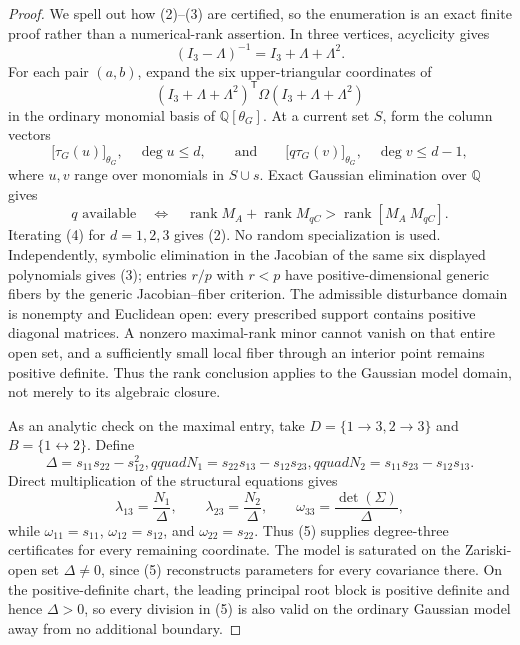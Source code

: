 \documentclass{article}
\begin{document}
\begin{proof}
We spell out how (2)--(3) are certified, so the enumeration is an exact finite proof rather than a numerical-rank assertion.  In three vertices, acyclicity gives
\[
 (I_3-\Lambda)^{-1}=I_3+\Lambda+\Lambda^2.
\]
For each pair \((a,b)\), expand the six upper-triangular coordinates of
\[
 (I_3+\Lambda+\Lambda^2)^{\mathsf T}\Omega(I_3+\Lambda+\Lambda^2)
\]
in the ordinary monomial basis of \(\mathbb Q[\theta_G]\).  At a current set \(S\), form the column vectors
\[
 \bigl[\tau_G(u)\bigr]_{\theta_G},\quad \deg u\leq d,
 \qquad\text{and}\qquad
 \bigl[q\tau_G(v)\bigr]_{\theta_G},\quad \deg v\leq d-1,
\]
where \(u,v\) range over monomials in \(S\cup s\).  Exact Gaussian elimination over \(\mathbb Q\) gives
\[
 q\text{ available}\quad\Longleftrightarrow\quad
 \operatorname{rank}M_A+\operatorname{rank}M_{qC}>
 \operatorname{rank}[M_A\ M_{qC}]. \tag{4}
\]
Iterating (4) for \(d=1,2,3\) gives (2).  No random specialization is used.  Independently, symbolic elimination in the Jacobian of the same six displayed polynomials gives (3); entries \(r/p\) with \(r<p\) have positive-dimensional generic fibers by the generic Jacobian--fiber criterion.
The admissible disturbance domain is nonempty and Euclidean open: every prescribed support contains positive diagonal matrices.  A nonzero maximal-rank minor cannot vanish on that entire open set, and a sufficiently small local fiber through an interior point remains positive definite.  Thus the rank conclusion applies to the Gaussian model domain, not merely to its algebraic closure.

As an analytic check on the maximal entry, take \(D=\{1\to3,2\to3\}\) and \(B=\{1\leftrightarrow2\}\).  Define
\[
 \Delta=s_{11}s_{22}-s_{12}^2,qquad
 N_1=s_{22}s_{13}-s_{12}s_{23},qquad
 N_2=s_{11}s_{23}-s_{12}s_{13}.
\]
Direct multiplication of the structural equations gives
\[
 \lambda_{13}=\frac{N_1}{\Delta},\qquad
 \lambda_{23}=\frac{N_2}{\Delta},\qquad
 \omega_{33}=\frac{\det(\Sigma)}{\Delta}, \tag{5}
\]
while \(\omega_{11}=s_{11}\), \(\omega_{12}=s_{12}\), and \(\omega_{22}=s_{22}\).  Thus (5) supplies degree-three certificates for every remaining coordinate.  The model is saturated on the Zariski-open set \(\Delta\neq0\), since (5) reconstructs parameters for every covariance there.
On the positive-definite chart, the leading principal root block is positive definite and hence \(\Delta>0\), so every division in (5) is also valid on the ordinary Gaussian model away from no additional boundary.


\end{proof}
\end{document}
